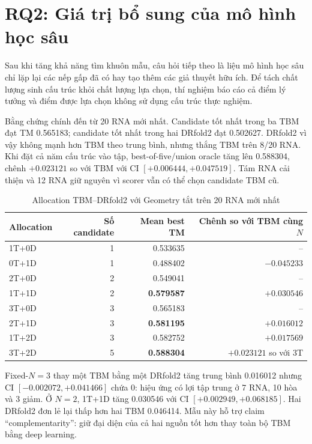 \documentclass[12pt,a4paper,oneside]{report}
\begin{document}
\section{RQ2: Giá trị bổ sung của mô hình học sâu}

Sau khi tăng khả năng tìm khuôn mẫu, câu hỏi tiếp theo là liệu mô hình học sâu chỉ lặp
lại các nếp gấp đã có hay tạo thêm các giả thuyết hữu ích. Để tách chất lượng sinh cấu
trúc khỏi chất lượng lựa chọn, thí nghiệm báo cáo cả điểm lý tưởng và điểm được lựa chọn
không sử dụng cấu trúc thực nghiệm.

Bằng chứng chính đến từ 20 RNA mới nhất. Candidate tốt nhất trong ba TBM đạt TM
0.565183; candidate tốt nhất trong hai DRfold2 đạt 0.502627. DRfold2 vì vậy không mạnh
hơn TBM theo trung bình, nhưng thắng TBM trên 8/20 RNA. Khi đặt cả năm cấu trúc vào tập,
best-of-five/union oracle tăng lên 0.588304, chênh $+0.023121$ so với TBM với CI
$[+0.006444,+0.047519]$. Tám RNA cải thiện và 12 RNA giữ nguyên vì scorer vẫn có thể
chọn candidate TBM cũ.

\begin{table}[H]
\centering
\caption{Allocation TBM--DRfold2 với Geometry tắt trên 20 RNA mới nhất}
\begin{tabular}{lrrr}
\toprule
Allocation & Số candidate & Mean best TM & Chênh so với TBM cùng $N$\\
\midrule
1T+0D & 1 & 0.533635 & --\\
0T+1D & 1 & 0.488402 & $-0.045233$\\
2T+0D & 2 & 0.549041 & --\\
1T+1D & 2 & \textbf{0.579587} & $+0.030546$\\
3T+0D & 3 & 0.565183 & --\\
2T+1D & 3 & \textbf{0.581195} & $+0.016012$\\
1T+2D & 3 & 0.582752 & $+0.017569$\\
3T+2D & 5 & \textbf{0.588304} & $+0.023121$ so với 3T\\
\bottomrule
\end{tabular}
\end{table}

Fixed-$N=3$ thay một TBM bằng một DRfold2 tăng trung bình 0.016012 nhưng CI
$[-0.002072,+0.041466]$ chứa 0: hiệu ứng có lợi tập trung ở 7 RNA, 10 hòa và 3 giảm.
Ở $N=2$, 1T+1D tăng 0.030546 với CI $[+0.002949,+0.068185]$. Hai DRfold2 đơn lẻ lại
thấp hơn hai TBM 0.046414. Mẫu này hỗ trợ claim ``complementarity'': giữ đại diện của
cả hai nguồn tốt hơn thay toàn bộ TBM bằng deep learning.
\end{document}
